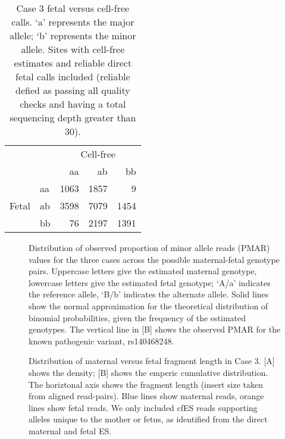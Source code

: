 \documentclass{article}\usepackage[]{graphicx}\usepackage[]{color}
\begin{document}
\begin{table}[h!]
  \centering
  \begin{tabular}{llrrr}
  \toprule
   & & \multicolumn{3}{c}{Cell-free} \\
   & & aa & ab & bb \\
   \midrule
   \multirow{3}{*}{Fetal} & aa & 1063 & 1857 & 9 \\
   & ab & 3598 & 7079 & 1454 \\
   & bb & 76 & 2197 & 1391 \\
  \bottomrule
  \end{tabular}
  \caption{Case 3 fetal versus cell-free calls. `a' represents the major allele; `b' represents the minor allele. Sites with cell-free estimates and reliable direct fetal calls included (reliable defied as passing all quality checks and having a total sequencing depth greater than 30).}
  \label{tab:c3calls}
\end{table}



\begin{figure}[h!]
  \centering
  \caption{Distribution of observed proportion of minor allele reads (PMAR) values for the three cases across the possible maternal-fetal genotype pairs. Uppercase letters give the estimated maternal genotype, lowercase letters give the estimated fetal genotype; `A/a' indicates the reference allele, `B/b' indicates the alternate allele. Solid lines show the normal approximation for the theoretical distribution of binomial probabilities, given the frequency of the estimated genotypes. The vertical line in [B] shows the observed PMAR for the known pathogenic variant, rs140468248.}
  \label{fig:genoHist}
\end{figure}



\begin{figure}[h!]
  \centering
  \caption{Distribution of maternal versus fetal fragment length in Case 3. [A] shows the density; [B] shows the emperic cumulative distribution. The horiztonal axis shows the fragment length (insert size taken from aligned read-pairs). Blue lines show maternal reads, orange lines show fetal reads. We only included cfES reads supporting alleles unique to the mother or fetus, as identified from the direct maternal and fetal ES.}
  \label{fig:c3fragLen}
\end{figure}
\end{document}
